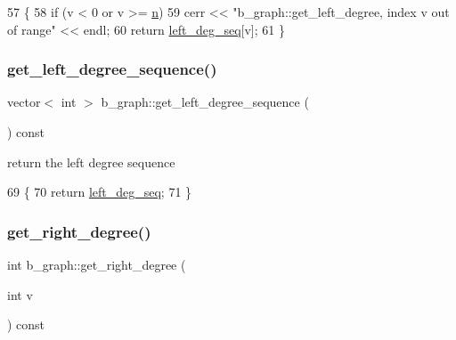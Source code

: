 \begin{DoxyCode}
57 \{
58   \textcolor{keywordflow}{if} (v < 0 or v >= \hyperlink{classb__graph_a9e211d40c1799bc9b125de472ff06642}{n})
59     cerr << \textcolor{stringliteral}{"b\_graph::get\_left\_degree, index v out of range"} << endl;
60   \textcolor{keywordflow}{return} \hyperlink{classb__graph_a311d16462dbb10c47b3a6c80a42139d9}{left\_deg\_seq}[v];
61 \}
\end{DoxyCode}
\mbox{\label{classb__graph_afd65fb655f7e24217393a10533b87d3c}} 
\subsubsection{\texorpdfstring{get\+\_\+left\+\_\+degree\+\_\+sequence()}{get\_left\_degree\_sequence()}}
{\footnotesize\ttfamily vector$<$ int $>$ b\+\_\+graph\+::get\+\_\+left\+\_\+degree\+\_\+sequence (\begin{DoxyParamCaption}{ }\end{DoxyParamCaption}) const}



return the left degree sequence 


\begin{DoxyCode}
69 \{
70   \textcolor{keywordflow}{return} \hyperlink{classb__graph_a311d16462dbb10c47b3a6c80a42139d9}{left\_deg\_seq};
71 \}
\end{DoxyCode}
\mbox{\label{classb__graph_a1caf2e1ca8ee19e7407f489be6b171b8}} 
\subsubsection{\texorpdfstring{get\+\_\+right\+\_\+degree()}{get\_right\_degree()}}
{\footnotesize\ttfamily int b\+\_\+graph\+::get\+\_\+right\+\_\+degree (\begin{DoxyParamCaption}\item[{int}]{v }\end{DoxyParamCaption}) const}



